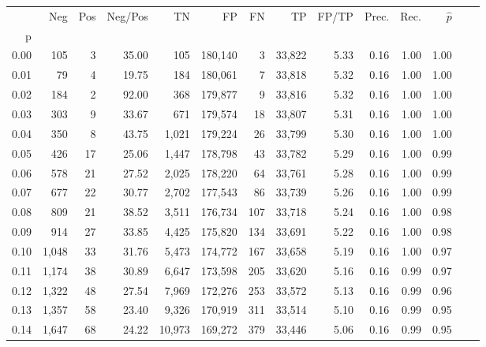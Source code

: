 \begin{tabular}{rrrrrrrrrrrrrr}
\toprule
{} &    Neg &  Pos & Neg/Pos &       TN &       FP &      FN &      TP & FP/TP & Prec. &  Rec. & $\hat{p}$ \\
p    &        &      &         &          &          &         &         &       &       &       &           \\
\midrule
0.00 &    105 &    3 &   35.00 &      105 &  180,140 &       3 &  33,822 &  5.33 &  0.16 &  1.00 &      1.00 \\
0.01 &     79 &    4 &   19.75 &      184 &  180,061 &       7 &  33,818 &  5.32 &  0.16 &  1.00 &      1.00 \\
0.02 &    184 &    2 &   92.00 &      368 &  179,877 &       9 &  33,816 &  5.32 &  0.16 &  1.00 &      1.00 \\
0.03 &    303 &    9 &   33.67 &      671 &  179,574 &      18 &  33,807 &  5.31 &  0.16 &  1.00 &      1.00 \\
0.04 &    350 &    8 &   43.75 &    1,021 &  179,224 &      26 &  33,799 &  5.30 &  0.16 &  1.00 &      1.00 \\
0.05 &    426 &   17 &   25.06 &    1,447 &  178,798 &      43 &  33,782 &  5.29 &  0.16 &  1.00 &      0.99 \\
0.06 &    578 &   21 &   27.52 &    2,025 &  178,220 &      64 &  33,761 &  5.28 &  0.16 &  1.00 &      0.99 \\
0.07 &    677 &   22 &   30.77 &    2,702 &  177,543 &      86 &  33,739 &  5.26 &  0.16 &  1.00 &      0.99 \\
0.08 &    809 &   21 &   38.52 &    3,511 &  176,734 &     107 &  33,718 &  5.24 &  0.16 &  1.00 &      0.98 \\
0.09 &    914 &   27 &   33.85 &    4,425 &  175,820 &     134 &  33,691 &  5.22 &  0.16 &  1.00 &      0.98 \\
0.10 &  1,048 &   33 &   31.76 &    5,473 &  174,772 &     167 &  33,658 &  5.19 &  0.16 &  1.00 &      0.97 \\
0.11 &  1,174 &   38 &   30.89 &    6,647 &  173,598 &     205 &  33,620 &  5.16 &  0.16 &  0.99 &      0.97 \\
0.12 &  1,322 &   48 &   27.54 &    7,969 &  172,276 &     253 &  33,572 &  5.13 &  0.16 &  0.99 &      0.96 \\
0.13 &  1,357 &   58 &   23.40 &    9,326 &  170,919 &     311 &  33,514 &  5.10 &  0.16 &  0.99 &      0.95 \\
0.14 &  1,647 &   68 &   24.22 &   10,973 &  169,272 &     379 &  33,446 &  5.06 &  0.16 &  0.99 &      0.95 \\

\end{tabular}
